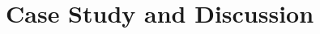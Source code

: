 \documentclass{llncs}
\begin{document}




\vspace{-3em}

\section{Case Study and Discussion}\label{results}
\end{document}
